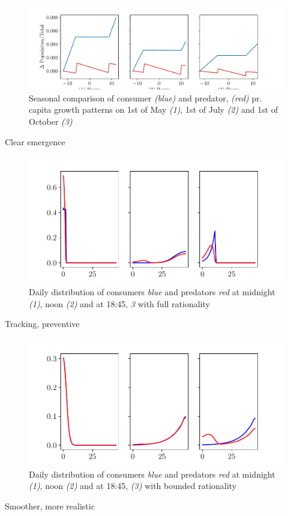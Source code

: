 \begin{figure}
\includegraphics{pop_short_rational.pdf}
\caption{Seasonal comparison of consumer \emph{(blue)} and predator, \emph{(red)} pr. capita growth patterns on 1st of May \emph{(1)}, 1st of July \emph{(2)} and 1st of October \emph{(3)}}
\label{fig:pop_short_term}

\end{figure}
Clear emergence
\begin{figure}
\includegraphics{specific_dists_rational.pdf}
\caption{Daily distribution of consumers \emph{blue} and predators \emph{red} at midnight \emph{(1)}, noon \emph{(2)} and at 18:45, \emph{3} with full rationality}
\label{fig:specific_dists_rational}
\end{figure}

Tracking, preventive
\begin{figure}
\includegraphics{specific_dists_semirational.pdf}
\caption{Daily distribution of consumers \emph{blue} and predators \emph{red} at midnight \emph{(1)}, noon \emph{(2)} and at 18:45, \emph{(3)} with bounded rationality}
\label{fig:specific_dists_irrational}
\end{figure}

Smoother, more realistic
